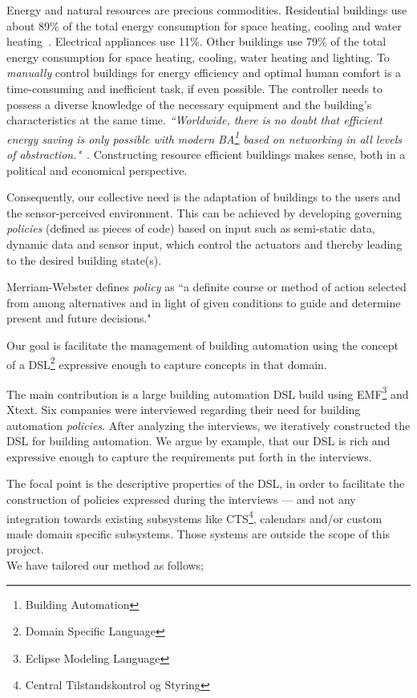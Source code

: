 Energy and natural resources are precious commodities. Residential buildings use about 89\% of the total energy consumption for space heating, cooling and water heating~\cite{janssen2004towards}. Electrical appliances use 11\%. Other buildings use 79\% of the total energy consumption for space heating, cooling, water heating and lighting. To \textit{manually} control buildings for energy efficiency and optimal human comfort is a time-consuming and inefficient task, if even possible. The controller needs to possess a diverse knowledge of the necessary equipment and the building's characteristics at the same time. \textit{``Worldwide, there is no doubt that efficient energy saving is only possible with modern BA\footnote{Building Automation} based on networking in all levels of abstraction."}~\cite{dietrich2010communication}. Constructing resource efficient buildings makes sense, both in a political and economical perspective. 

Consequently, our collective need is the adaptation of buildings to the users and the sensor-perceived environment. This can be achieved by developing governing \textit{policies} (defined as pieces of code) based on input such as semi-static data, dynamic data and sensor input, which control the actuators and thereby leading to the desired building state(s).

Merriam-Webster defines \textit{policy} as ``a definite course or method of action selected from among alternatives and in light of given conditions to guide and determine present and future decisions."

Our goal is facilitate the management of building automation using the concept of a DSL\footnote{Domain Specific Language} expressive enough to capture concepts in that domain.

The main contribution is a large building automation DSL build using EMF\footnote{Eclipse Modeling Language} and Xtext. Six companies were interviewed regarding their need for building automation \textit{policies}. After analyzing the interviews, we iteratively constructed the DSL for building automation. We argue by example, that our DSL is rich and expressive enough to capture the requirements put forth in the interviews. 

The focal point is the descriptive properties of the DSL, in order to facilitate the construction of policies expressed during the interviews --- and not any integration towards existing subsystems like CTS\footnote{Central Tilstandskontrol og Styring}, calendars and/or custom made domain specific subsystems. Those systems are outside the scope of this project.
\newline\\
We have tailored our method as follows;

